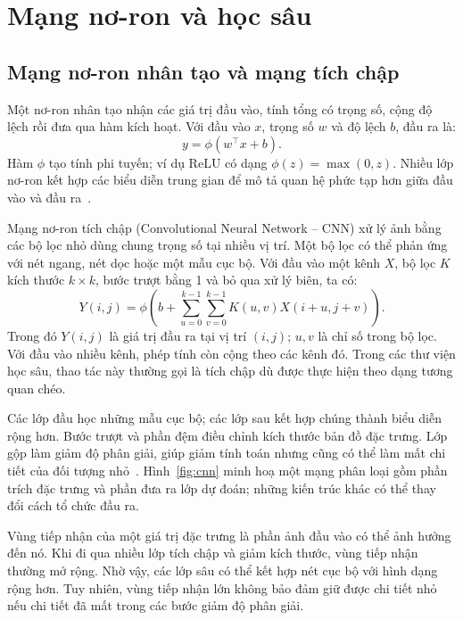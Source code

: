 \section{Mạng nơ-ron và học sâu}
\subsection{Mạng nơ-ron nhân tạo và mạng tích chập}
Một nơ-ron nhân tạo nhận các giá trị đầu vào, tính tổng có trọng số, cộng độ lệch rồi đưa qua hàm kích hoạt. Với đầu vào $x$, trọng số $w$ và độ lệch $b$, đầu ra là:
\begin{equation}
 y=\phi(w^{\top}x+b).
 \label{eq:neuron}
\end{equation}
Hàm $\phi$ tạo tính phi tuyến; ví dụ ReLU có dạng $\phi(z)=\max(0,z)$. Nhiều lớp nơ-ron kết hợp các biểu diễn trung gian để mô tả quan hệ phức tạp hơn giữa đầu vào và đầu ra~\cite{stanford_neuralnets}.

Mạng nơ-ron tích chập (Convolutional Neural Network -- CNN) xử lý ảnh bằng các bộ lọc nhỏ dùng chung trọng số tại nhiều vị trí. Một bộ lọc có thể phản ứng với nét ngang, nét dọc hoặc một mẫu cục bộ. Với đầu vào một kênh $X$, bộ lọc $K$ kích thước $k\times k$, bước trượt bằng 1 và bỏ qua xử lý biên, ta có:
\begin{equation}
 Y(i,j)=\phi\!\left(b+\sum_{u=0}^{k-1}\sum_{v=0}^{k-1}K(u,v)X(i+u,j+v)\right).
 \label{eq:conv}
\end{equation}
Trong đó $Y(i,j)$ là giá trị đầu ra tại vị trí $(i,j)$; $u,v$ là chỉ số trong bộ lọc. Với đầu vào nhiều kênh, phép tính còn cộng theo các kênh đó. Trong các thư viện học sâu, thao tác này thường gọi là tích chập dù được thực hiện theo dạng tương quan chéo.

Các lớp đầu học những mẫu cục bộ; các lớp sau kết hợp chúng thành biểu diễn rộng hơn. Bước trượt và phần đệm điều chỉnh kích thước bản đồ đặc trưng. Lớp gộp làm giảm độ phân giải, giúp giảm tính toán nhưng cũng có thể làm mất chi tiết của đối tượng nhỏ~\cite{stanford_cs231n_cnn}. Hình~\ref{fig:cnn} minh hoạ một mạng phân loại gồm phần trích đặc trưng và phần đưa ra lớp dự đoán; những kiến trúc khác có thể thay đổi cách tổ chức đầu ra.

Vùng tiếp nhận của một giá trị đặc trưng là phần ảnh đầu vào có thể ảnh hưởng đến nó. Khi đi qua nhiều lớp tích chập và giảm kích thước, vùng tiếp nhận thường mở rộng. Nhờ vậy, các lớp sâu có thể kết hợp nét cục bộ với hình dạng rộng hơn. Tuy nhiên, vùng tiếp nhận lớn không bảo đảm giữ được chi tiết nhỏ nếu chi tiết đã mất trong các bước giảm độ phân giải.


